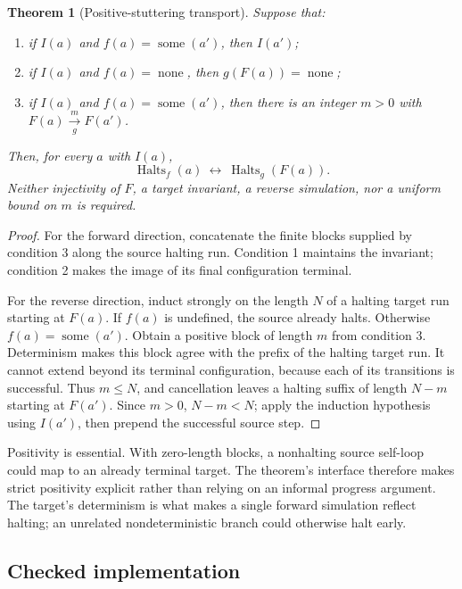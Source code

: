 \documentclass[11pt]{article}
\newtheorem{theorem}{Theorem}
\newcommand{\Halts}{\operatorname{Halts}}
\begin{document}
\begin{theorem}[Positive-stuttering transport]\label{thm:transport}
Suppose that:
\begin{enumerate}
\item if $I(a)$ and $f(a)=\operatorname{some}(a')$, then $I(a')$;
\item if $I(a)$ and $f(a)=\operatorname{none}$, then $g(F(a))=\operatorname{none}$;
\item if $I(a)$ and $f(a)=\operatorname{some}(a')$, then there is an integer $m>0$ with $F(a)\xrightarrow[g]{m}F(a')$.
\end{enumerate}
Then, for every $a$ with $I(a)$,
\[
\Halts_f(a)\ \longleftrightarrow\ \Halts_g(F(a)).
\]
Neither injectivity of $F$, a target invariant, a reverse simulation, nor a uniform bound on $m$ is required.
\end{theorem}

\begin{proof}
For the forward direction, concatenate the finite blocks supplied by condition 3 along the source halting run. Condition 1 maintains the invariant; condition 2 makes the image of its final configuration terminal.

For the reverse direction, induct strongly on the length $N$ of a halting target run starting at $F(a)$. If $f(a)$ is undefined, the source already halts. Otherwise $f(a)=\operatorname{some}(a')$. Obtain a positive block of length $m$ from condition 3. Determinism makes this block agree with the prefix of the halting target run. It cannot extend beyond its terminal configuration, because each of its transitions is successful. Thus $m\leq N$, and cancellation leaves a halting suffix of length $N-m$ starting at $F(a')$. Since $m>0$, $N-m<N$; apply the induction hypothesis using $I(a')$, then prepend the successful source step.
\end{proof}

Positivity is essential. With zero-length blocks, a nonhalting source self-loop could map to an already terminal target. The theorem's interface therefore makes strict positivity explicit rather than relying on an informal progress argument. The target's determinism is what makes a single forward simulation reflect halting; an unrelated nondeterministic branch could otherwise halt early.

\subsection{Checked implementation}
\end{document}
